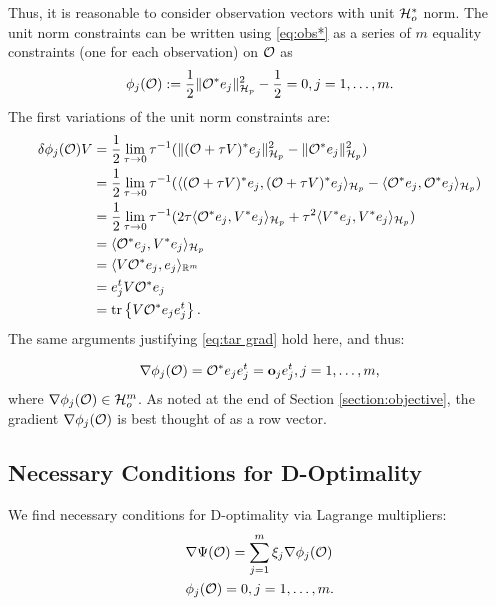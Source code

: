 Thus, it is reasonable to consider observation vectors with unit
$\mathcal{H}_o^*$ norm. The unit norm constraints can be written using
\eqref{eq:obs*} as a series of $m$ equality constraints (one for each
observation) on $\mathcal{O}$ as
\begin{align}\label{eq:constraints}
  \phi_j(\obs) :=\frac12 \| \obs^* e_j\|_{\hilp}^2 - \frac12 = 0,j=1,\dots,m.
\end{align}
The first variations of the unit norm constraints are:
\begin{align*}
  \delta \phi_j(\obs)V  
  &= \frac12\lim_{\tau \to 0}\tau^{-1}
  ( \|(\obs + \tau V)^*e_j \|_{\hilp}^2 - \|\obs ^*e_j \|_{\hilp}^2  ) \\
  &= \frac12\lim_{\tau \to 0}\tau^{-1}
  ( \langle (\obs + \tau V)^*e_j, (\obs + \tau V)^*e_j \rangle_{\hilp} - 
  \langle \obs^*e_j, \obs^*e_j \rangle_{\hilp} ) \\
  &= \frac12\lim_{\tau \to 0}\tau^{-1}
  (2\tau \langle \obs^*e_j,V^*e_j \rangle_{\hilp} 
  +\tau^2 \langle V^*e_j, V^*e_j \rangle_{\hilp} ) \\
  &= \langle \obs^*e_j,V^*e_j \rangle_{\hilp} \\
  &= \langle V \obs^*e_j,e_j \rangle_{\R^m} \\
  &= e_j^t V \obs^* e_j \\
  &= \tr{V \obs^* e_je_j^t}.
\end{align*}
The same arguments justifying \eqref{eq:tar grad} hold here, and thus:

\begin{align}\label{eq:grad constraints}
\nabla \phi_j(\obs) = \obs^* e_j e_j^t = \meas_j e_j^t , j=1,\dots,m,
\end{align}
where $\nabla \phi_j(\mathcal{O}) \in \mathcal{H}_o^m$. As noted at the end of
Section \ref{section:objective}, the gradient $\nabla \phi_j(\mathcal{O})$ is
best thought of as a row vector.

\subsection{Necessary Conditions for D-Optimality}\label{subsec:necessary}
We find necessary conditions for D-optimality via Lagrange
multipliers:
\begin{align}
  &\nabla \tar(\obs) = \sum_{j=1}^m \xi_j \nabla \phi_j (\obs)
  \label{eq:Lagrange mult1} \\
    &\phi_j(\obs) = 0, j = 1,\dots,m. \label{eq:Lagrange mult2}
\end{align}

